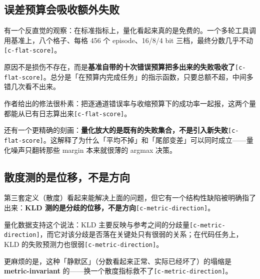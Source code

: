 \subsection{误差预算会吸收额外失败}

有一个反直觉的观察：在标准指标上，量化看起来真的是免费的。一个多轮工具调用基准上，八个格子、每格 456 个 episode、16/8/4 bit 三档，最终分数几乎不动{\scriptsize\texttt{[c-\hspace{0pt}flat-\hspace{0pt}score]}}。


原因不是损伤不存在，而是\textbf{基准自带的十次错误预算把多出来的失败吸收了}{\scriptsize\texttt{[c-\hspace{0pt}flat-\hspace{0pt}score]}}。总分是「在预算内完成任务」的指示函数，只要总额不超，中间多错几次看不出来。


作者给出的修法很朴素：把逐通道错误率与收缩预算下的成功率一起报，这两个量都能从已有日志算出来{\scriptsize\texttt{[c-\hspace{0pt}flat-\hspace{0pt}score]}}。


还有一个更精确的刻画：\textbf{量化放大的是既有的失败集合，不是引入新失败}{\scriptsize\texttt{[c-\hspace{0pt}flat-\hspace{0pt}score]}}。这解释了为什么「平均不掉」和「尾部变差」可以同时成立——量化噪声只翻转那些 margin 本来就很薄的 argmax 决策。


\subsection{散度测的是位移，不是方向}

第三套定义（散度）看起来能解决上面的问题，但它有一个结构性缺陷被明确指了出来：\textbf{KLD 测的是分歧的位移，不是方向}{\scriptsize\texttt{[c-\hspace{0pt}metric-\hspace{0pt}direction]}}。


量化数据支持这个说法：KLD 主要反映与参考之间的分歧量{\scriptsize\texttt{[c-\hspace{0pt}metric-\hspace{0pt}direction]}}，而它对该分歧是否落在关键处只有很弱的关系；在代码任务上，KLD 的失败预测力也很弱{\scriptsize\texttt{[c-\hspace{0pt}metric-\hspace{0pt}direction]}}。


更麻烦的是，这种「静默区」（分数看起来正常、实际已经坏了）的塌缩是 \textbf{metric-invariant} 的——换一个散度指标救不了{\scriptsize\texttt{[c-\hspace{0pt}metric-\hspace{0pt}direction]}}。


